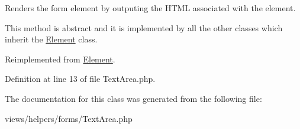 Renders the form element by outputing the HTML associated with the element. 

This method is abstract and it is implemented by all the other classes which inherit the \hyperlink{class_element}{Element} class. 

Reimplemented from \hyperlink{class_element_a8fd45d1d43cf11f3dadab39b0306a960}{Element}.



Definition at line 13 of file TextArea.php.



The documentation for this class was generated from the following file:\begin{DoxyCompactItemize}
\item 
views/helpers/forms/TextArea.php\end{DoxyCompactItemize}
